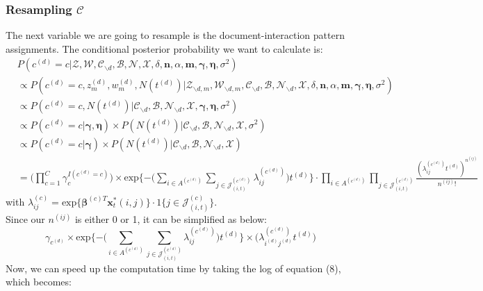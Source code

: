\documentclass[a4paper]{article}
\begin{document}
  \subsubsection{Resampling $\mathcal{C}$}
  The next variable we are going to resample is the document-interaction pattern assignments. The conditional posterior probability we want to calculate is:
  \begin{equation}
  \begin{aligned} & P(c^{(d)}=c|\mathcal{Z}, \mathcal{W}, \mathcal{C}_{\backslash d}, \mathcal{B}, \mathcal{N}, \mathcal{X}, \delta, \boldsymbol{n}, \alpha, \boldsymbol{m}, \boldsymbol{\gamma}, \boldsymbol{\eta}, \sigma^2)\\ &\propto  P(c^{(d)}=c, z^{(d)}_m, w^{(d)}_m, N{(t^{(d)})}|\mathcal{Z}_{\backslash d, m}, \mathcal{W}_{\backslash d, m}, \mathcal{C}_{\backslash d}, \mathcal{B}, \mathcal{N}_{\backslash d}, \mathcal{X}, \delta, \boldsymbol{n}, \alpha, \boldsymbol{m}, \boldsymbol{\gamma}, \boldsymbol{\eta}, \sigma^2)\\ & \propto P(c^{(d)}=c, N{(t^{(d)})}| \mathcal{C}_{\backslash d}, \mathcal{B}, \mathcal{N}_{\backslash d}, \mathcal{X}, \boldsymbol{\gamma}, \boldsymbol{\eta}, \sigma^2) \\ & \propto P(c^{(d)}=c|\boldsymbol{\gamma}, \boldsymbol{\eta}) \times P( N{(t^{(d)})} | \mathcal{C}_{\backslash d}, \mathcal{B}, \mathcal{N}_{\backslash d}, \mathcal{X}, \sigma^2)  \\ & \propto P(c^{(d)}=c|\boldsymbol{\gamma}) \times P( N{(t^{(d)})} | \mathcal{C}_{\backslash d}, \mathcal{B}, \mathcal{N}_{\backslash d}, \mathcal{X}) \\ & =\Big(\prod_{c=1}^{C} \gamma_{c}^{I(c^{(d)}=c)}\Big)\times \mbox{exp}\Big\{{-\big(\sum\limits_{i \in A^{(c^{(d)})}}\sum\limits_{j\in \mathcal{J}^{(c^{(d)})}_{(i, t)}}\lambda_{ij}^{(c^{(d)})}\big)t^{(d)}}\Big\}\cdot \prod_{i \in A^{(c^{(d)})}}\prod_{j\in \mathcal{J}^{(c^{(d)})}_{(i, t)}}\frac{(\lambda_{ij}^{(c^{(d)})}t^{(d)})^{n^{(ij)}}}{n^{(ij)}!} 
 \end{aligned}
  \end{equation}
  	with $\lambda_{ij}^{(c)}=\mbox{exp}\Big\{\boldsymbol{\beta}^{(c)T}\boldsymbol{x}^*_t(i, j)\Big\}\cdot 1\{j \in \mathcal{J}^{(c)}_{(i, t)}\}$. \\\newline
  	Since our $n^{(ij)}$ is either 0 or 1, it can be simplified as below:
  	\begin{equation} \gamma_{c^{(d)}}\times \mbox{exp}\Big\{{-\big(\sum\limits_{i \in A^{(c^{(d)})}}\sum\limits_{j\in \mathcal{J}^{(c^{(d)})}_{(i, t)}}\lambda_{ij}^{(c^{(d)})}\big)t^{(d)}}\Big\}\times \Big(\lambda_{i^{(d)}j^{(d)}}^{(c^{(d)})}t^{(d)}\Big)
  	   \end{equation}
  	  Now, we can speed up the computation time by taking the log of equation (8), which becomes:
  	 
\end{document}
